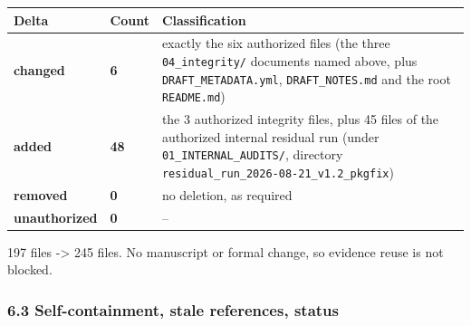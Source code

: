 \documentclass[
  10pt,
]{article}
\newcounter{none} %
\begin{document}
{\def\LTcaptype{none} %
\begin{longtable}[]{@{}
  >{\raggedright\arraybackslash}p{}
  >{\raggedright\arraybackslash}p{}
  >{\raggedright\arraybackslash}p{}@{}}
\toprule\noalign{}
\begin{minipage}[b]{\linewidth}\raggedright
Delta
\end{minipage} & \begin{minipage}[b]{\linewidth}\raggedright
Count
\end{minipage} & \begin{minipage}[b]{\linewidth}\raggedright
Classification
\end{minipage} \\
\midrule\noalign{}
\endhead
\bottomrule\noalign{}
\endlastfoot
\textbf{changed} & \textbf{6} & exactly the six authorized files (the
three \texttt{04\_integrity/} documents named above, plus
\texttt{DRAFT\_METADATA.yml}, \texttt{DRAFT\_NOTES.md} and the root
\texttt{README.md}) \\
\textbf{added} & \textbf{48} & the 3 authorized integrity files, plus 45
files of the authorized internal residual run (under
\texttt{01\_INTERNAL\_AUDITS/}, directory
\texttt{residual\_run\_2026-08-21\_v1.2\_pkgfix}) \\
\textbf{removed} & \textbf{0} & no deletion, as required \\
\textbf{unauthorized} & \textbf{0} & -- \\
\end{longtable}
}

197 files -\textgreater{} 245 files. No manuscript or formal change, so
evidence reuse is not blocked.

\subsubsection{6.3 Self-containment, stale references,
status}\label{self-containment-stale-references-status}
\end{document}
